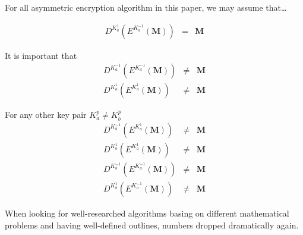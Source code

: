 For all asymmetric encryption algorithm in this paper, we may assume that\ldots

\begin{eqnarray}
	D^{K^{1}_a}\left(E^{K^{-1}_a}\left(\mathbf{M}\right)\right) & = & \mathbf{M}
\end{eqnarray} 

It is important that 
\begin{eqnarray}
	D^{K^{-1}_a}\left(E^{K^{-1}_a}\left(\mathbf{M}\right)\right) & \neq & \mathbf{M}\\
	D^{K^{1}_a}\left(E^{K^{1}_a}\left(\mathbf{M}\right)\right)   & \neq & \mathbf{M}
\end{eqnarray} 

For any other key pair $K^{p}_a \neq K^{p}_b$
\begin{eqnarray}
	D^{K^{-1}_b}\left(E^{K^{1}_a}\left(\mathbf{M}\right)\right)  & \neq & \mathbf{M}\\
	D^{K^{1}_b}\left(E^{K^{1}_a}\left(\mathbf{M}\right)\right)   & \neq & \mathbf{M}\\
	D^{K^{-1}_b}\left(E^{K^{-1}_a}\left(\mathbf{M}\right)\right) & \neq & \mathbf{M}\\
	D^{K^{1}_b}\left(E^{K^{-1}_a}\left(\mathbf{M}\right)\right)  & \neq & \mathbf{M}
\end{eqnarray} 

When looking for well-researched algorithms basing on different mathematical problems and having well-defined outlines, numbers dropped dramatically again.

